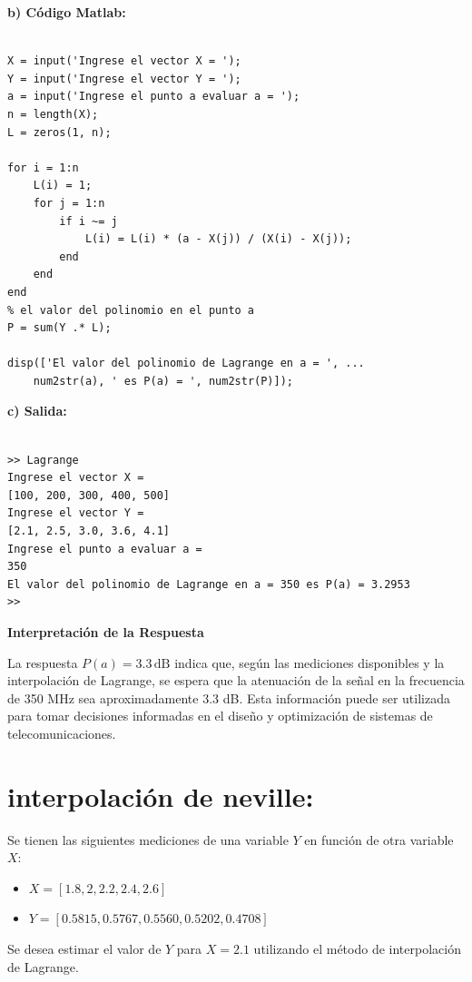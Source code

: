 \documentclass[12pt,a4paper,twoside]{article}  %
\begin{document}
\textbf{b) Código Matlab:}

\begin{lstlisting}

X = input('Ingrese el vector X = ');
Y = input('Ingrese el vector Y = ');
a = input('Ingrese el punto a evaluar a = ');
n = length(X);
L = zeros(1, n);

for i = 1:n
    L(i) = 1;
    for j = 1:n
        if i ~= j
            L(i) = L(i) * (a - X(j)) / (X(i) - X(j));
        end
    end
end
% el valor del polinomio en el punto a
P = sum(Y .* L);

disp(['El valor del polinomio de Lagrange en a = ', ...
    num2str(a), ' es P(a) = ', num2str(P)]);

\end{lstlisting}

\textbf{c) Salida:}

\begin{verbatim}

>> Lagrange
Ingrese el vector X = 
[100, 200, 300, 400, 500]
Ingrese el vector Y = 
[2.1, 2.5, 3.0, 3.6, 4.1]
Ingrese el punto a evaluar a = 
350
El valor del polinomio de Lagrange en a = 350 es P(a) = 3.2953
>> 

\end{verbatim}
\textbf{Interpretación de la Respuesta}

La respuesta \(P(a) = 3.3 \, \text{dB}\) indica que, según las mediciones disponibles y la interpolación de Lagrange, se espera que la atenuación de la señal en la frecuencia de 350 MHz sea aproximadamente 3.3 dB. Esta información puede ser utilizada para tomar decisiones informadas en el diseño y optimización de sistemas de telecomunicaciones.

\section{interpolación de neville: }

Se tienen las siguientes mediciones de una variable \(Y\) en función de otra variable \(X\):

\begin{itemize}
    \item \(X = [1.8,2 ,2.2, 2.4 ,2.6  ]\)
    \item \(Y = [0.5815, 0.5767, 0.5560 ,0.5202, 0.4708]\)
\end{itemize}

Se desea estimar el valor de \(Y\) para \(X = 2.1\) utilizando el método de interpolación de Lagrange.
\end{document}
